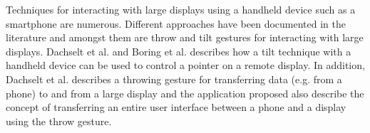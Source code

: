 Techniques for interacting with large displays using a handheld device such as a smartphone are numerous.
Different approaches have been documented in the literature and amongst them are throw and tilt gestures for interacting with large displays.
Dachselt et al. \cite{Dachselt:2008} and Boring et al. \cite{Boring:2009} describes how a tilt technique with a handheld device can be used to control a pointer on a remote display.
In addition, Dachselt et al. describes a throwing gesture for transferring data (e.g. from a phone) to and from a large display and the application proposed also describe the concept of transferring an entire user interface between a phone and a display using the throw gesture.